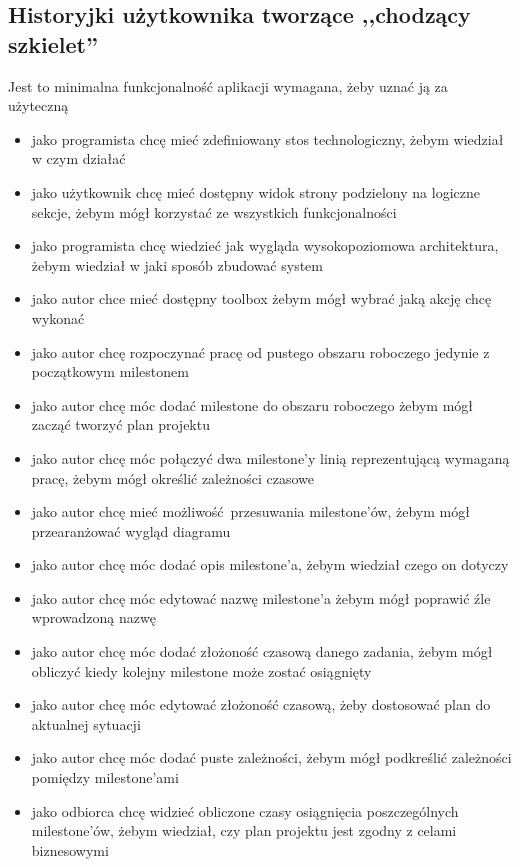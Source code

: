 \subsection{Historyjki użytkownika tworzące ,,chodzący szkielet''}
Jest to minimalna funkcjonalność aplikacji wymagana, żeby uznać ją za użyteczną
\begin{itemize}
	\item jako programista chcę mieć zdefiniowany stos technologiczny, żebym wiedział w czym działać
	\item jako użytkownik chcę mieć dostępny widok strony podzielony na logiczne sekcje, żebym mógł korzystać ze wszystkich funkcjonalności
	\item jako programista chcę wiedzieć jak wygląda wysokopoziomowa architektura, żebym wiedział w jaki sposób zbudować system
	\item jako autor chce mieć dostępny toolbox żebym mógł wybrać jaką akcję chcę wykonać
	\item jako autor chcę rozpoczynać pracę od pustego obszaru roboczego jedynie z początkowym milestonem
	\item jako autor chcę móc dodać milestone do obszaru roboczego żebym mógł zacząć tworzyć plan projektu
	\item jako autor chcę móc połączyć dwa milestone'y linią reprezentującą wymaganą pracę, żebym mógł określić zależności czasowe
	\item jako autor chcę mieć możliwość przesuwania milestone'ów, żebym mógł przearanżować wygląd diagramu
	\item jako autor chcę móc dodać opis milestone'a, żebym wiedział czego on dotyczy
	\item jako autor chcę móc edytować nazwę milestone'a żebym mógł poprawić źle wprowadzoną nazwę
	\item jako autor chcę móc dodać złożoność czasową danego zadania, żebym mógł obliczyć kiedy kolejny milestone może zostać osiągnięty
	\item jako autor chcę móc edytować złożoność czasową, żeby dostosować plan do aktualnej sytuacji
	\item jako autor chcę móc dodać puste zależności, żebym mógł podkreślić zależności pomiędzy milestone'ami
	\item jako odbiorca chcę widzieć obliczone czasy osiągnięcia poszczególnych milestone'ów, żebym wiedział, czy plan projektu jest zgodny z celami biznesowymi
\end{itemize}